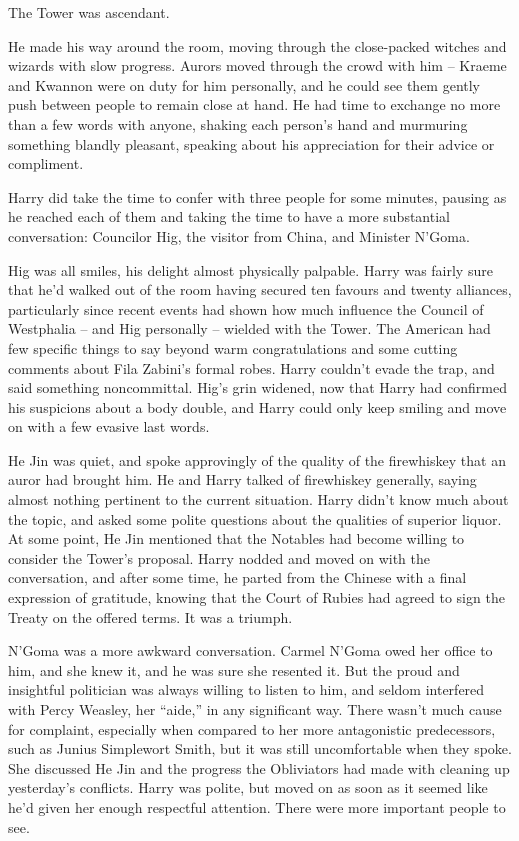 The Tower was ascendant.

He made his way around the room, moving through the close-packed witches
and wizards with slow progress. Aurors moved through the crowd with him
-- Kraeme and Kwannon were on duty for him personally, and he could see
them gently push between people to remain close at hand. He had time to
exchange no more than a few words with anyone, shaking each person's
hand and murmuring something blandly pleasant, speaking about his
appreciation for their advice or compliment.

Harry did take the time to confer with three people for some minutes,
pausing as he reached each of them and taking the time to have a more
substantial conversation: Councilor Hig, the visitor from China, and
Minister N'Goma.

Hig was all smiles, his delight almost physically palpable. Harry was
fairly sure that he'd walked out of the room having secured ten favours
and twenty alliances, particularly since recent events had shown how
much influence the Council of Westphalia -- and Hig personally --
wielded with the Tower. The American had few specific things to say
beyond warm congratulations and some cutting comments about Fila
Zabini's formal robes. Harry couldn't evade the trap, and said something
noncommittal. Hig's grin widened, now that Harry had confirmed his
suspicions about a body double, and Harry could only keep smiling and
move on with a few evasive last words.

He Jin was quiet, and spoke approvingly of the quality of the
firewhiskey that an auror had brought him. He and Harry talked of
firewhiskey generally, saying almost nothing pertinent to the current
situation. Harry didn't know much about the topic, and asked some polite
questions about the qualities of superior liquor. At some point, He Jin
mentioned that the Notables had become willing to consider the Tower's
proposal. Harry nodded and moved on with the conversation, and after
some time, he parted from the Chinese with a final expression of
gratitude, knowing that the Court of Rubies had agreed to sign the
Treaty on the offered terms. It was a triumph.

N'Goma was a more awkward conversation. Carmel N'Goma owed her office to
him, and she knew it, and he was sure she resented it. But the proud and
insightful politician was always willing to listen to him, and seldom
interfered with Percy Weasley, her ``aide,'' in any significant way.
There wasn't much cause for complaint, especially when compared to her
more antagonistic predecessors, such as Junius Simplewort Smith, but it
was still uncomfortable when they spoke. She discussed He Jin and the
progress the Obliviators had made with cleaning up yesterday's
conflicts. Harry was polite, but moved on as soon as it seemed like he'd
given her enough respectful attention. There were more important people
to see.

